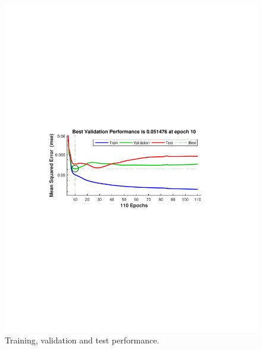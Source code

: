 \documentclass[twocolumn,10pt]{asme2e}
\begin{document}
\begin{figure}[t]
	\centering
	\includegraphics[width=1\linewidth]{./Figures/trainingPerf}
	\caption{ Training, validation and test performance. }
	\label{fig:trainingPerf}
\end{figure}
\end{document}
